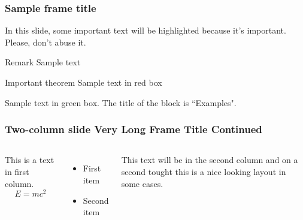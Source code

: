 \documentclass{beamer}
\begin{document}
\begin{frame}
\frametitle{Sample frame title}

In this slide, some important text will be
\alert{highlighted} because it's important.
Please, don't abuse it.

\begin{block}{Remark}
Sample text
\end{block}

\begin{alertblock}{Important theorem}
Sample text in red box
\end{alertblock}

\begin{examples}
Sample text in green box. The title of the block is ``Examples".
\end{examples}
\end{frame}


\begin{frame}
\frametitle{Two-column slide Very Long Frame Title Continued}

\begin{columns}

This is a text in first column.
$$E=mc^2$$
\begin{itemize}
\item First item
\item Second item
\end{itemize}

This text will be in the second column
and on a second tought this is a nice looking
layout in some cases.
\end{columns}
\end{frame}
\end{document}
